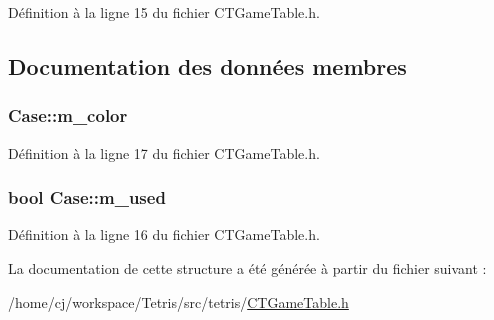 Définition à la ligne 15 du fichier C\-T\-Game\-Table.\-h.



\subsection{Documentation des données membres}
\hypertarget{struct_case_a2edf0eece87b9b67e7cd6b97e1f63622}{
\subsubsection[{m\-\_\-color}]{ Case\-::m\-\_\-color}}\label{struct_case_a2edf0eece87b9b67e7cd6b97e1f63622}


Définition à la ligne 17 du fichier C\-T\-Game\-Table.\-h.

\hypertarget{struct_case_ab36a7bb1d1f4da76aedde0cd2db71f88}{
\subsubsection[{m\-\_\-used}]{\setlength{\rightskip}{0pt plus 5cm}bool Case\-::m\-\_\-used}}\label{struct_case_ab36a7bb1d1f4da76aedde0cd2db71f88}


Définition à la ligne 16 du fichier C\-T\-Game\-Table.\-h.



La documentation de cette structure a été générée à partir du fichier suivant \-:\begin{DoxyCompactItemize}
\item 
/home/cj/workspace/\-Tetris/src/tetris/\hyperlink{_c_t_game_table_8h}{C\-T\-Game\-Table.\-h}\end{DoxyCompactItemize}
